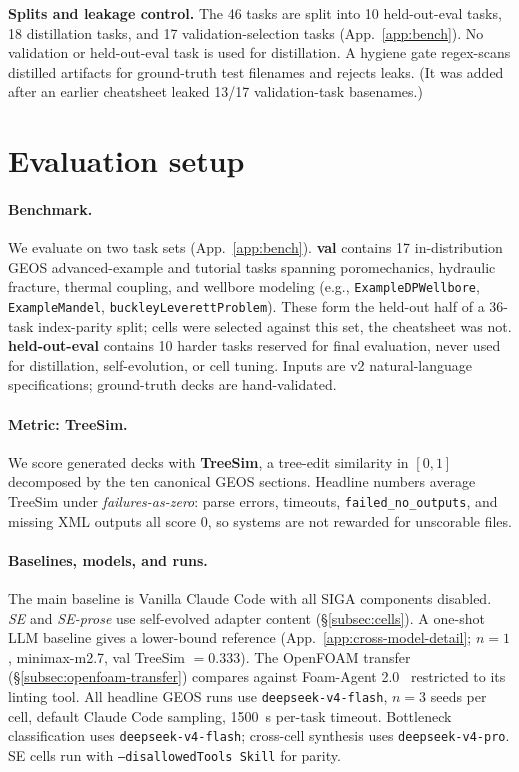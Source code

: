 \documentclass{article}
\begin{document}
\textbf{Splits and leakage control.} The 46 tasks are split into 10 held-out-eval tasks, 18 distillation tasks, and 17 validation-selection tasks (App.~\ref{app:bench}). No validation or held-out-eval task is used for distillation. A hygiene gate regex-scans distilled artifacts for ground-truth test filenames and rejects leaks. (It was added after an earlier cheatsheet leaked 13/17 validation-task basenames.)

\section{Evaluation setup}
\label{sec:eval}

\paragraph{Benchmark.} We evaluate on two task sets (App.~\ref{app:bench}). \textbf{val} contains 17 in-distribution GEOS advanced-example and tutorial tasks spanning poromechanics, hydraulic fracture, thermal coupling, and wellbore modeling (e.g., \texttt{ExampleDPWellbore}, \texttt{ExampleMandel}, \texttt{buckleyLeverettProblem}). These form the held-out half of a 36-task index-parity split; cells were selected against this set, the cheatsheet was not. \textbf{held-out-eval} contains 10 harder tasks reserved for final evaluation, never used for distillation, self-evolution, or cell tuning. Inputs are v2 natural-language specifications; ground-truth decks are hand-validated.

\paragraph{Metric: TreeSim.}\label{subsec:metric} We score generated decks with \textbf{TreeSim}, a tree-edit similarity in $[0,1]$ decomposed by the ten canonical GEOS sections. Headline numbers average TreeSim under \emph{failures-as-zero}: parse errors, timeouts, \texttt{failed\_no\_outputs}, and missing XML outputs all score 0, so systems are not rewarded for unscorable files.

\paragraph{Baselines, models, and runs.}\label{subsec:baselines} The main baseline is Vanilla Claude Code with all SIGA components disabled. \emph{SE} and \emph{SE-prose} use self-evolved adapter content (\S\ref{subsec:cells}). A one-shot LLM baseline gives a lower-bound reference (App.~\ref{app:cross-model-detail}; $n=1$, minimax-m2.7, val TreeSim $=0.333$). The OpenFOAM transfer (\S\ref{subsec:openfoam-transfer}) compares against Foam-Agent 2.0~\citep{foamagent2025} restricted to its linting tool. All headline GEOS runs use \texttt{deepseek-v4-flash}, $n=3$ seeds per cell, default Claude Code sampling, 1500~s per-task timeout. Bottleneck classification uses \texttt{deepseek-v4-flash}; cross-cell synthesis uses \texttt{deepseek-v4-pro}. SE cells run with \texttt{--disallowedTools Skill} for parity.
\end{document}
